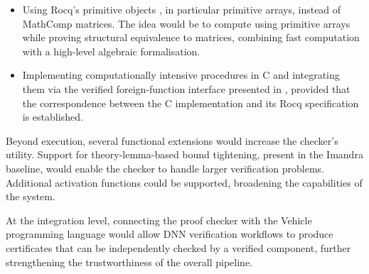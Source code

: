 \begin{itemize}
	\item Using Rocq's primitive objects \cite{rocq_primitive_objects}, in particular primitive arrays, instead of MathComp matrices. The idea would be to compute using primitive arrays while proving structural equivalence to matrices, combining fast computation with a high-level algebraic formalisation.

	\item Implementing computationally intensive procedures in C and integrating them via the verified foreign-function interface presented in \citet{foreign_function_interface_rocq_c}, provided that the correspondence between the C implementation and its Rocq specification is established.
\end{itemize}

Beyond execution, several functional extensions would increase the checker's utility. Support for theory-lemma-based bound tightening, present in the Imandra baseline, would enable the checker to handle larger verification problems. Additional activation functions could be supported, broadening the capabilities of the system.

At the integration level, connecting the proof checker with the Vehicle programming language \cite{vehicle} would allow DNN verification workflows to produce certificates that can be independently checked by a verified component, further strengthening the trustworthiness of the overall pipeline.

